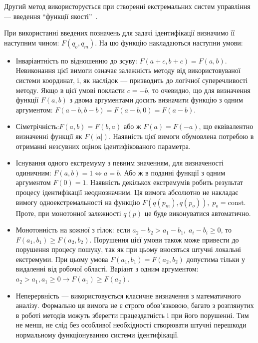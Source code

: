 Другий метод використорується при створенні екстремальних систем управління ---
введення ``функції якості''~\cite{eykhoff_modern_id,info_cipkin}.

При використанні введених позначень для задачі ідентифікації
визначимо її наступним чином:
\label{atu:d:F}$F(q_o, q_m)$.
На цю функцію накладаються наступни умови:

\begin{itemize}

  \item
    Інваріантність по відношенню до зсуву:
    $F(a+c,b+c) = F(a,b)$.
    Невиконання цієї вимоги означає залежність методу від
    використовуваної системи координат, і, як наслідок --- призводить
    до логічної суперечливості методу. Якщо в цієї умові покласти
    $ c = -b $, то очевидно, що для визначення функції
    $ F (a, b) $ з двома аргументами досить визначити функцію з одним
    аргументом: $ F (a-b, b-b) = F (a-b, 0 ) = F (a-b) $.

  \item
    Сіметрічність:$ F (a, b) = F (b, a) $ або ж
    $F (a) = F (-a) $, що еквівалентно визначенні функції як
    $F(|a|) $. Наявність цієї вимоги обумовлена потребою в отриманні
    незсувних оцінок ідентифікованого параметра.

  \item
    Існування одного екстремуму
    з певним значенням, для визначеності одиничним:
    $F(a,b) = 1  \Leftrightarrow a = b $.
    Або ж в поданні функції з одним аргументом
    $ F (0) = 1 $. Наявність декількох екстремумів робить результат
    процесу ідентифікації неоднозначним. Ця вимога абсолютно не
    накладає вимогу одноекстремальності на функцію
    $ F (q (p_m), q (p_o)), \; p_o = \mathrm{const} $. Проте, при монотонної залежності
    $q(p)$ це буде виконуватися автоматично.

  \item
    Монотонність на кожної з гілок:
    если $ a_2-b_2 > a_1-b_1, \; a_i-b_i \ge 0$, то $F(a_1,b_1) \ge F(a_2,b_2)$.
    Порушення цієї умови також може привести до порушення
    процесу пошуку, так як при цьому вносяться штучні локальні
    екстремуми. При цьому умова
    $ F (a_1, b_1) = F (a_2, b_2) $ допустима тільки у видаленні від робочої
    області. Варіант з одним аргументом:
    $ a_2 > a_1, a_1 \ge 0 \to F(a_1) \ge F(a_2)$.

  \item
    Неперервність ---
    використовується класичне визначення з математичного
    аналізу. Формально ця вимога не є строго обов'язковою, багато з
    розглянутих в роботі методів можуть зберегти працездатність
    і при його порушенні. Тим не менш, не слід без особливої
    необхідності створювати штучні перешкоди нормальному
    функціонуванню системи ідентифікації.

\end{itemize}

